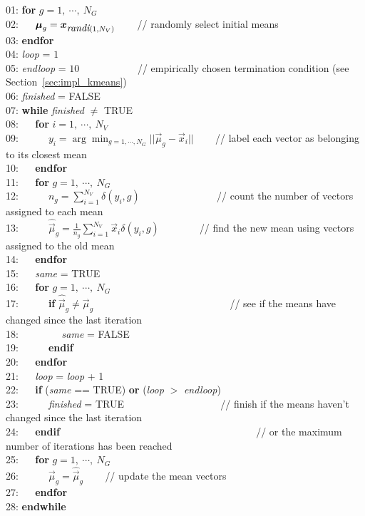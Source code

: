 \begin{small}
\begin{tabbing}
01: {\bf for} $g=1, ~\cdots, ~N_G$ \\
02: ~~ $\Vec{\mu}_g = \Vec{x}_{ \mbox{\it randi}(1, N_V) } $ ~~~ {\small // randomly select initial means} \\
03: {\bf endfor} \\
04: {\it loop} = $1$ \\
05: {\it endloop} = $10$ ~~~ ~~~ ~~~ {\small // empirically chosen termination condition (see Section~\ref{sec:impl_kmeans})} \\
06: {\it finished} = FALSE \\
07: {\bf while} {\it finished} $\neq$ TRUE \\
08: ~~ {\bf for} $i=1, ~\cdots, ~N_V$ \\
09: ~~ ~~ \( y_i = {\displaystyle \arg \min_{g=1, \cdots, N_G}} || \Vec{\mu}_g - \Vec{x}_i || \) ~~~ {\small // label each vector as belonging to its closest mean} \\
10: ~~ {\bf endfor} \\
11: ~~ {\bf for} $g=1, ~\cdots, ~N_G$ \\
12: ~~ ~~ $n_g = \sum\nolimits_{i=1}^{N_V} \delta(y_i, g) $  ~~~ ~~~ ~~~ ~~~ {\small // count the number of vectors assigned to each mean} \\
13: ~~ ~~ $\widehat{\Vec{\mu}}_g = \frac{1}{n_g} \sum\nolimits_{i=1}^{N_V} \Vec{x}_i \delta(y_i, g) $ ~~~ ~~~ {\small // find the new mean using vectors assigned to the old mean} \\
14: ~~ {\bf endfor} \\
15: ~~ {\it same} = TRUE \\
16: ~~ {\bf for} $g=1, ~\cdots, ~N_G$ \\
17: ~~ ~~ {\bf if} $\widehat{\Vec{\mu}}_g \neq \Vec{\mu}_g $  ~~~ ~~~ ~~~ ~~~ ~~~ ~~~ ~~~~ {\small // see if the means have changed since the last iteration} \\
18: ~~ ~~ ~~ {\it same} = FALSE \\
19: ~~ ~~ {\bf endif} \\
20: ~~ {\bf endfor} \\
21: ~~ {\it loop} = {\it loop} + 1 \\
22: ~~ {\bf if} ({\it same} == TRUE) {\bf or} ({\it loop} $>$ {\it endloop})  \\
23: ~~ ~~ {\it finished} = TRUE  ~~~~~~~~~~~~~~~~~~ {\small // finish if the means haven't changed since the last iteration} \\
24: ~~ {\bf endif} ~~~ ~~ ~~ ~~~~~~~~~~~~~~~~~~~~~~~~~~~~~ {\small // or the maximum number of iterations has been reached} \\
25: ~~ {\bf for} $g=1, ~\cdots, ~N_G$ \\
26: ~~ ~~ $\Vec{\mu}_g = \widehat{\Vec{\mu}}_g$ ~~~ {\small // update the mean vectors} \\
27: ~~ {\bf endfor} \\
28: {\bf endwhile}
\end{tabbing}
\end{small}

